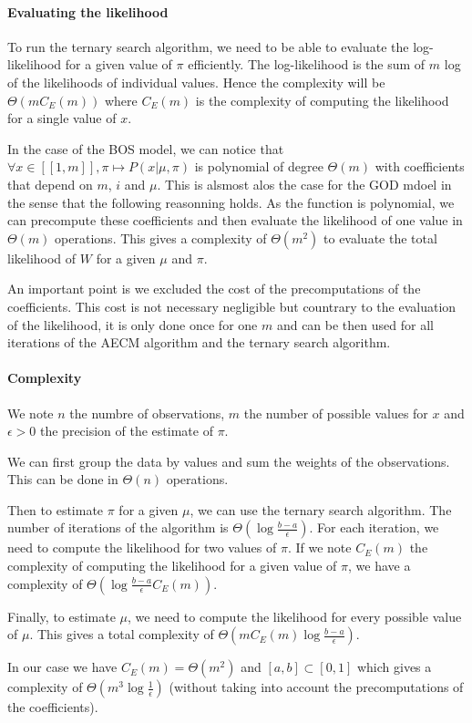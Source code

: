 
\paragraph{Evaluating the likelihood}

To run the ternary search algorithm, we need to be able to evaluate the log-likelihood for a given value of $\pi$ efficiently.
The log-likelihood is the sum of $m$ log of the likelihoods of individual values.
Hence the complexity will be $\Theta(m C_E(m))$ where $C_E(m)$ is the complexity of computing the likelihood for a single value of $x$.

In the case of the BOS model, we can notice that $\forall x \in [[1, m]], \pi \mapsto P(x | \mu, \pi)$ is polynomial of degree $\Theta(m)$ with coefficients that depend on $m$, $i$ and $\mu$. This is alsmost alos the case for the GOD mdoel in the sense that the following reasonning holds. As the function is polynomial, we can precompute these coefficients and then evaluate the likelihood of one value in $\Theta(m)$ operations. This gives a complexity of $\Theta(m^2)$ to evaluate the total likelihood of $W$ for a given $\mu$ and $\pi$. 

An important point is we excluded the cost of the precomputations of the coefficients. This cost is not necessary negligible but countrary to the evaluation of the likelihood, it is only done once for one $m$ and can be then used for all iterations of the AECM algorithm and the ternary search algorithm.


\paragraph{Complexity}

We note $n$ the numbre of observations, $m$ the number of possible values for $x$ and $\epsilon > 0$ the precision of the estimate of $\pi$.

We can first group the data by values and sum the weights of the observations. This can be done in $\Theta(n)$ operations.

Then to estimate $\pi$ for a given $\mu$, we can use the ternary search algorithm. The number of iterations of the algorithm is $\Theta(\log \frac{b - a}{\epsilon})$. For each iteration, we need to compute the likelihood for two values of $\pi$. If we note $C_E(m)$ the complexity of computing the likelihood for a given value of $\pi$, we have a complexity of $\Theta(\log \frac{b - a}{\epsilon} C_E(m))$.

Finally, to estimate $\mu$, we need to compute the likelihood for every possible value of $\mu$. This gives a total complexity of $\Theta(m C_E(m) \log \frac{b - a}{\epsilon} )$.

In our case we have $C_E(m) = \Theta(m^2)$ and $[a, b] \subset [0, 1]$ which gives a complexity of $\Theta(m^3 \log \frac{1}{\epsilon})$ (without taking into account the precomputations of the coefficients).
